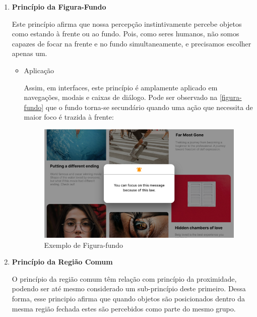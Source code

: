 \begin{enumerate}
    \item \textbf{Princípio da Figura-Fundo}
    
    Este princípio afirma que nossa percepção instintivamente percebe objetos como estando à frente ou ao fundo. Pois, como seres humanos, não somos capazes de focar na frente e no fundo simultaneamente, e precisamos escolher apenas um.
    
    \begin{itemize}
        \item Aplicação
        
        Assim, em interfaces, este princípio é amplamente aplicado em navegações, modais e caixas de diálogo. Pode ser observado na \autoref{figura-fundo} que o fundo torna-se secundário quando uma ação que necessita de maior foco é trazida à frente:
        
        \begin{figure}[htb]
        	\begin{center}
        	    \includegraphics[scale=0.45]{figs/figura-fundo.png}
        	\end{center}
        	\caption{\label{figura-fundo}Exemplo de Figura-fundo}
        \end{figure}
    \end{itemize}
    
    \item \textbf{Princípio da Região Comum}
    
    O princípio da região comum têm relação com princípio da proximidade, podendo ser até mesmo considerado um sub-princípio deste primeiro. Dessa forma, esse principio afirma que quando objetos são posicionados dentro da mesma região fechada estes são percebidos como parte do mesmo grupo.
    

\end{enumerate}
